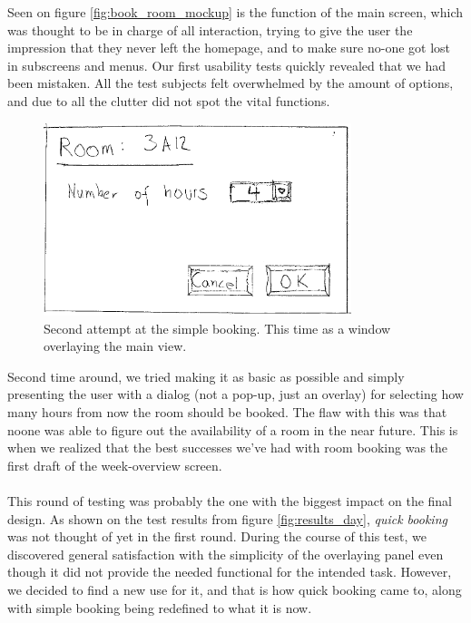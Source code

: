Seen on figure \ref{fig:book_room_mockup} is the function of the main screen, which was thought to be in charge of all interaction, trying to give the user the impression that they never left the homepage, and to make sure no-one got lost in subscreens and menus. Our first usability tests quickly revealed that we had been mistaken. All the test subjects felt overwhelmed by the amount of options, and due to all the clutter did not spot the vital functions.
\pagebreak
\begin{figure}[htb]
\begin{center}
\leavevmode
\includegraphics[width=0.8\textwidth]{images/bookRoomMockup2}
\end{center}
\caption{Second attempt at the simple booking. This time as a window overlaying the main view.}
\label{fig:book_room_mockup2}
\end{figure}

Second time around, we tried making it as basic as possible and simply presenting the user with a dialog (not a pop-up, just an overlay) for selecting how many hours from now the room should be booked. The flaw with this was that noone was able to figure out the availability of a room in the near future. This is when we realized that the best successes we've had with room booking was the first draft of the week-overview screen. \\
\\
This round of testing was probably the one with the biggest impact on the final design. As shown on the test results from figure \ref{fig:results_day}, \emph{quick booking} was not thought of yet in the first round. During the course of this test, we discovered general satisfaction with the simplicity of the overlaying panel even though it did not provide the needed functional for the intended task. However, we decided to find a new use for it, and that is how quick booking came to, along with simple booking being redefined to what it is now.

